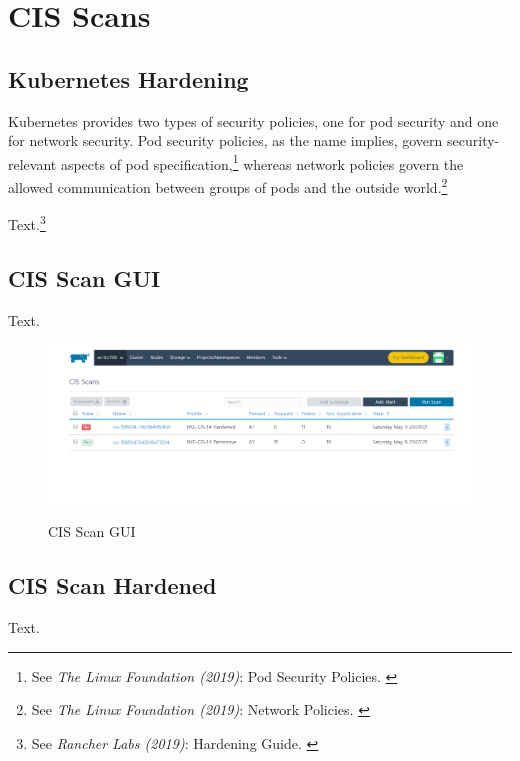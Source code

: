 %
%

\pagebreak
\section{CIS Scans}

\onehalfspacing

\subsection{Kubernetes Hardening}

Kubernetes provides two types of security policies, one for pod security and one for network security. Pod security policies, as the name implies, govern security-relevant aspects of pod specification,\footnote{See \textit{The Linux Foundation (2019)}: Pod Security Policies. \cite{podSecurity}} whereas network policies govern the allowed communication between groups of pods and the outside world.\footnote{See \textit{The Linux Foundation (2019)}: Network Policies. \cite{netSecurity}}

Text.\footnote{See \textit{Rancher Labs (2019)}: Hardening Guide. \cite{hardeningGuide}}

\subsection{CIS Scan GUI}

Text. 

\begin{figure}[H]
\centering
\caption {CIS Scan GUI}
\includegraphics[width=\linewidth]{images/cis-scan-overview.png}
\label{fig:cisScanOverview}
\end{figure}

\subsection{CIS Scan Hardened}

Text. 


